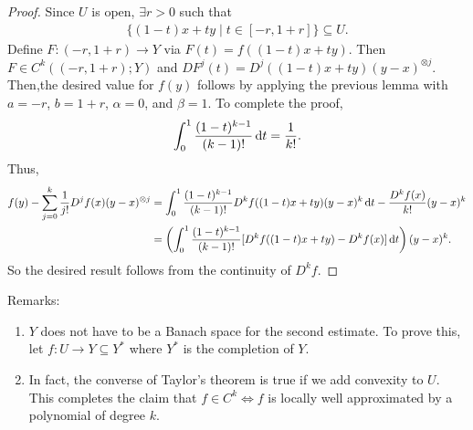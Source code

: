 \documentclass{report}
\begin{document}
\begin{proof}
    Since $U$ is open, $\exists r > 0$ such that 
    \begin{align*}
        \{(1-t)x + ty \mid t \in [-r, 1+r] \} \subseteq U.
    \end{align*}
    Define $F: (-r, 1+r) \to Y$ via $F(t) = f((1-t)x + ty)$. Then $F \in C^k((-r, 1+r) ; Y)$ and $DF^j(t) = D^j((1-t)x + ty) (y-x)^{\otimes j}$. Then,the desired value for $f(y)$ follows by applying the previous lemma with $a = -r$, $b = 1+r$, $\alpha = 0$, and $\beta = 1$. To complete the proof, 
    \begin{align*}
        \int_0^1 \frac{(1-t)^{k-1}}{(k-1)!} \, \text dt = \frac{1}{k!}.
    \end{align*}
    Thus, 
    \begin{align*}
        f(y) - \sum_{j=0}^{k} \frac{1}{j!} D^jf(x) (y-x)^{\otimes j} &= \int_0^1 \frac{(1-t)^{k-1}}{(k-1)!} D^{k} f((1-t)x + ty) (y-x)^{k} \, \text dt  - \frac{D^kf(x)}{k!}(y-x)^k\\
        &= \left(\int_0^1 \frac{(1-t)^{k-1}}{(k-1)!} [D^{k} f((1-t)x + ty) - D^kf(x)]  \, \text dt \right)(y-x)^{k}.
    \end{align*}
    So the desired result follows from the continuity of $D^kf$.
\end{proof}
\noindent Remarks:
\begin{enumerate}
    \item $Y$ does not have to be a Banach space for the second estimate. To prove this, let $f: U \to Y \subseteq Y^*$ where $Y^*$ is the completion of $Y$.
    \item In fact, the converse of Taylor's theorem is true if we add convexity to $U$. This completes the claim that $f \in C^k \iff f$ is locally well approximated by a polynomial of degree $k$.
\end{enumerate}
\end{document}
